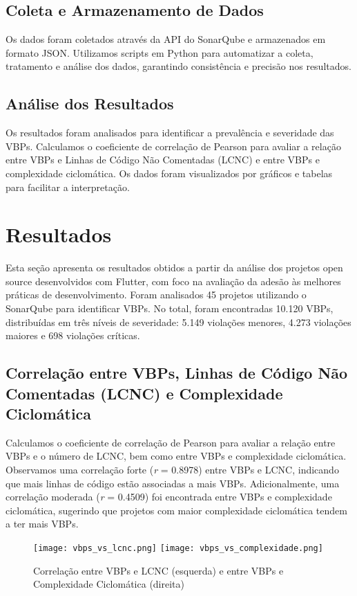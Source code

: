 \documentclass[12pt]{article}
\begin{document}
\subsection{Coleta e Armazenamento de Dados}
Os dados foram coletados através da API do SonarQube e armazenados em formato JSON. Utilizamos scripts em Python para automatizar a coleta, tratamento e análise dos dados, garantindo consistência e precisão nos resultados.

\subsection{Análise dos Resultados}
Os resultados foram analisados para identificar a prevalência e severidade das VBPs. Calculamos o coeficiente de correlação de Pearson para avaliar a relação entre VBPs e Linhas de Código Não Comentadas (LCNC) e entre VBPs e complexidade ciclomática. Os dados foram visualizados por gráficos e tabelas para facilitar a interpretação.

\section{Resultados}

Esta seção apresenta os resultados obtidos a partir da análise dos projetos open source desenvolvidos com Flutter, com foco na avaliação da adesão às melhores práticas de desenvolvimento. Foram analisados 45 projetos utilizando o SonarQube para identificar VBPs. No total, foram encontradas 10.120 VBPs, distribuídas em três níveis de severidade: 5.149 violações menores, 4.273 violações maiores e 698 violações críticas.

\subsection{Correlação entre VBPs, Linhas de Código Não Comentadas (LCNC) e Complexidade Ciclomática}
Calculamos o coeficiente de correlação de Pearson para avaliar a relação entre VBPs e o número de LCNC, bem como entre VBPs e complexidade ciclomática. Observamos uma correlação forte (\textit{r} = 0.8978) entre VBPs e LCNC, indicando que mais linhas de código estão associadas a mais VBPs. Adicionalmente, uma correlação moderada (\textit{r} = 0.4509) foi encontrada entre VBPs e complexidade ciclomática, sugerindo que projetos com maior complexidade ciclomática tendem a ter mais VBPs.

\begin{figure}[H]
\centering
\texttt{[image: vbps\_vs\_lcnc.png]}
\texttt{[image: vbps\_vs\_complexidade.png]}
\caption{Correlação entre VBPs e LCNC (esquerda) e entre VBPs e Complexidade Ciclomática (direita)}
\label{fig
}
\end{figure}
\end{document}
